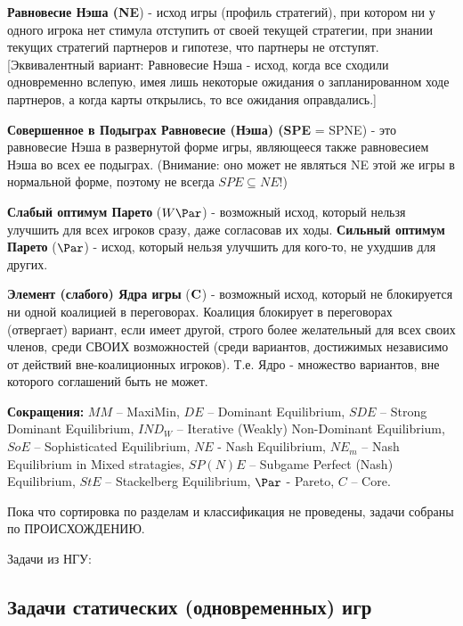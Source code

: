 \documentclass[a4paper,12pt]{article}
\begin{document}
\textbf{Равновесие Нэша (NE}) -  исход игры
(профиль стратегий), при котором ни у одного игрока
нет стимула отступить от своей текущей стратегии,
при знании текущих стратегий партнеров и гипотезе,
что партнеры не отступят. [Эквивалентный вариант:
Равновесие Нэша - исход, когда все сходили
одновременно вслепую, имея лишь некоторые ожидания
о запланированном ходе партнеров, а когда карты
открылись, то все ожидания
оправдались.]\vspace{2mm}

\textbf{Совершенное в Подыграх Равновесие (Нэша)
(SPE} = SPNE) - это равновесие Нэша в развернутой
форме игры, являющееся также равновесием Нэша во
всех ее подыграх. (Внимание: оно может не являться
NE этой же игры в нормальной форме, поэтому не
всегда $SPE\subseteq NE$!)\vspace{2mm}

\textbf{Слабый оптимум Парето} ($W\Par$) -
возможный исход, который нельзя улучшить для всех
игроков сразу, даже согласовав их ходы.
\textbf{Сильный оптимум Парето} ($\Par$) - исход,
который нельзя улучшить для кого-то, не ухудшив для
других. \vspace{2mm}

\textbf{Элемент (слабого) Ядра игры} (${\bf C}$) -
возможный исход, который не блокируется ни одной
коалицией в переговорах. Коалиция блокирует в
переговорах (отвергает) вариант, если имеет другой,
строго более желательный для всех своих членов,
среди СВОИХ возможностей (среди вариантов,
достижимых независимо от действий вне-коалиционных
игроков). Т.е. Ядро - множество вариантов, вне
которого соглашений быть не может. \vspace{2mm}

{\bf Сокращения:}  $MM$ -- MaxiMin, $DE$ --
Dominant Equilibrium, $SDE$ -- Strong Dominant
Equilibrium, $IND_W$ -- Iterative (Weakly)
Non-Dominant Equilibrium,  $SoE$ -- Sophisticated
Equilibrium, $NE$ - Nash Equilibrium,  $NE_m$ --
Nash Equilibrium in Mixed stratagies, $SP(N)E$ --
Subgame Perfect (Nash) Equilibrium, $StE$ --
Stackelberg Equilibrium, $\Par$ - Pareto, $C$ --
Core. \vspace{2mm}

\newpage

Пока что сортировка по разделам и классификация не
проведены, задачи собраны по ПРОИСХОЖДЕНИЮ.

{\Large Задачи из НГУ:}

\subsection{Задачи статических (одновременных) игр}
\end{document}
